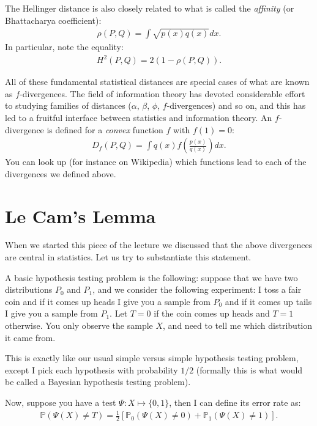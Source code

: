 \documentclass[twoside,12pt]{article}
\begin{document}
\begin{enumerate}
The Hellinger distance is also closely related to what is called the \emph{affinity} (or Bhattacharya coefficient):
\begin{align*}
\rho(P,Q) = \int \sqrt{p(x)q(x)} dx. 
\end{align*}
In particular, note the equality:
\begin{align*}
H^2(P,Q) = 2 \left( 1 - \rho(P,Q) \right).
\end{align*}
\end{enumerate}

All of these fundamental statistical distances are special cases of what are known as $f$-divergences. The field of information theory has devoted considerable effort to studying families of distances ($\alpha$, $\beta$, $\phi$, $f$-divergences) and so on, and this has led to a fruitful interface between statistics and information theory. An $f$-divergence is defined for a \emph{convex} function $f$ with $f(1) = 0$: 
\begin{align*}
D_f(P,Q) = \int q(x) f\left(\frac{p(x)}{q(x)} \right) dx.
\end{align*}
You can look up (for instance on Wikipedia) which functions lead to each of the divergences we defined above.

\section{Le Cam's Lemma}
When we started this piece of the lecture we discussed that the above divergences are central in statistics. Let us try to substantiate this statement.

A basic hypothesis testing problem is the following: suppose that we have two distributions $P_0$ and $P_1$, and we consider the following experiment: I toss a fair coin and if it comes up heads I give you a sample from $P_0$ and if it comes up tails I give you a sample from $P_1$. Let $T = 0$ if the coin comes up heads and $T = 1$ otherwise. You only observe the sample $X$, and need to tell me which distribution it came from.

This is exactly like our usual simple versus simple hypothesis testing problem, except I pick each hypothesis with probability $1/2$ (formally this is what would be called a Bayesian hypothesis testing problem).

Now, suppose you have a test $\Psi: X \mapsto \{0,1\}$, then I can define its error rate as:
\begin{align*}
\mathbb{P}(\Psi(X) \neq T) = \frac{1}{2} \left[ \mathbb{P}_0 (\Psi(X) \neq 0) + \mathbb{P}_1 (\Psi(X) \neq 1) \right].
\end{align*}
\end{document}
